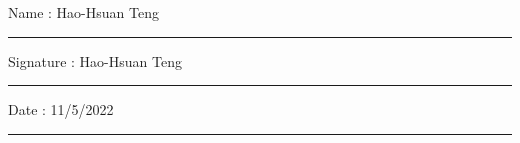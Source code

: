 \documentclass[11pt,oneside]{book}
\begin{document}
\noindent Name : Hao-Hsuan Teng\\[1mm]
\rule[1em]{25em}{0.5pt}

\noindent Signature : Hao-Hsuan Teng\\[1mm]
\rule[1em]{25em}{0.5pt}

\noindent Date : 11/5/2022\\[1mm]
\rule[1em]{25em}{0.5pt}





\tableofcontents
\listoffigures 
{} 

\mainmatter









 


\begin{appendices}
	
\end{appendices}
\end{document}
